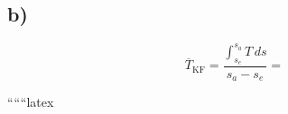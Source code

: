 

\subsection*{b)}
\[
\overline{T}_{\text{KF}} = \frac{\int_{s_e}^{s_a} T \, ds}{s_a - s_e} =
\]

``````latex